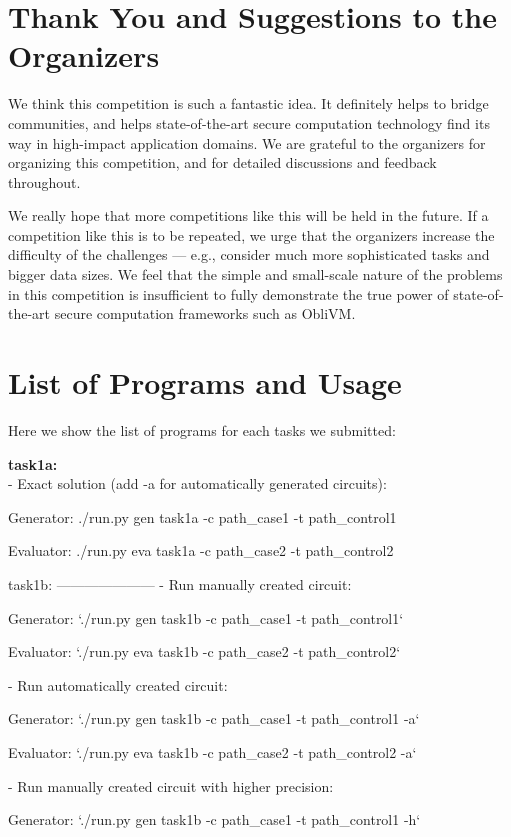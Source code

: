 \documentclass[11pt]{article}
\begin{document}
\section{Thank You and Suggestions to the Organizers}
We think this competition is such a fantastic idea. 
It definitely helps to bridge communities, and helps 
state-of-the-art secure computation technology  
find its way in high-impact application domains.
We are grateful to the organizers for organizing this competition,
and for detailed discussions and feedback 
throughout.

We really hope that more competitions like this will be held in the future.
If a competition like this is to be repeated, we 
urge that the organizers increase the difficulty 
of the challenges --- e.g., consider much more sophisticated tasks
and bigger data sizes. 
We feel that the simple and small-scale nature of the problems  
in this competition is insufficient to fully demonstrate the true power
of state-of-the-art secure computation frameworks such as {\sf ObliVM}.

\section{List of Programs and Usage}
Here we show the list of programs for each tasks we submitted:

\textbf{task1a:}\\
  -  Exact solution (add -a for automatically generated circuits):

      Generator: ./run.py gen task1a -c path\_case1 -t path\_control1

      Evaluator: ./run.py eva task1a -c path\_case2 -t path\_control2

task1b:
---------------------
  - Run manually created circuit:

      Generator: `./run.py gen task1b -c path_case1 -t path_control1`

      Evaluator: `./run.py eva task1b -c path_case2 -t path_control2`

 -  Run automatically created circuit:

      Generator: `./run.py gen task1b -c path_case1 -t path_control1 -a`

      Evaluator: `./run.py eva task1b -c path_case2 -t path_control2 -a`

- Run manually created circuit with higher precision:

      Generator: `./run.py gen task1b -c path_case1 -t path_control1 -h`
\end{document}
